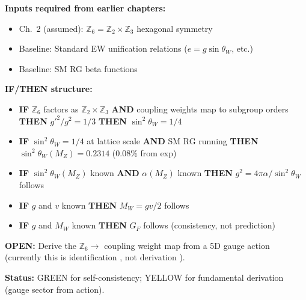 
\begin{tcolorbox}[colback=blue!5!white, colframe=blue!50!black,
    title=\textbf{Dependency \& Status (IF/THEN)}]

\textbf{Inputs required from earlier chapters:}
\begin{itemize}[nosep]
    \item Ch.~2 (assumed): $\mathbb{Z}_6 = \mathbb{Z}_2 \times \mathbb{Z}_3$ hexagonal symmetry
    \item Baseline: Standard EW unification relations ($e = g\sin\theta_W$, etc.) \tagBL{}
    \item Baseline: SM RG beta functions \tagBL{}
\end{itemize}

\textbf{IF/THEN structure:}
\begin{itemize}[nosep]
    \item \textbf{IF} $\mathbb{Z}_6$ factors as $\mathbb{Z}_2 \times \mathbb{Z}_3$ \textbf{AND}
          coupling weights map to subgroup orders \tagI{}
          \textbf{THEN} $g'^2/g^2 = 1/3$ \textbf{THEN} $\sin^2\theta_W = 1/4$ \tagDc{}
    \item \textbf{IF} $\sin^2\theta_W = 1/4$ at lattice scale \textbf{AND}
          SM RG running \tagBL{}
          \textbf{THEN} $\sin^2\theta_W(M_Z) = 0.2314$ (0.08\% from exp) \tagDc{}
    \item \textbf{IF} $\sin^2\theta_W(M_Z)$ known \textbf{AND} $\alpha(M_Z)$ known \tagBL{}
          \textbf{THEN} $g^2 = 4\pi\alpha/\sin^2\theta_W$ follows \tagDc{}
    \item \textbf{IF} $g$ and $v$ known \textbf{THEN} $M_W = gv/2$ follows \tagDc{}
    \item \textbf{IF} $g$ and $M_W$ known \textbf{THEN} $G_F$ follows (consistency, not prediction) \tagDc{}
\end{itemize}

\textbf{OPEN:} Derive the $\mathbb{Z}_6 \to$ coupling weight map from a 5D gauge action
(currently this is identification \tagI{}, not derivation \tagDc{}).

\textbf{Status:} GREEN for self-consistency; YELLOW for fundamental derivation (gauge sector from action).
\end{tcolorbox}


